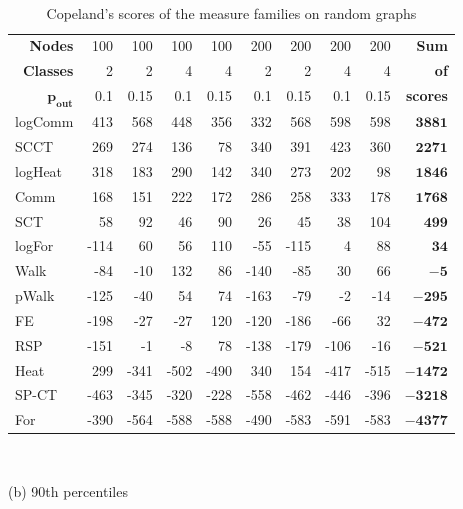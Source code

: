 \documentclass{article}
\begin{document}
\begin{table}[H]
{\begin{minipage}{.49\textwidth}
	\end{minipage}\ \ \ \ \
	\begin{minipage}{.49\textwidth}
		\centering
		\begin{tabular}{lrrrrrrrrr}
			\toprule
			\multicolumn{1}{r}{\textbf{Nodes}}         & 100&    100& 100&  100& 200&  200& 200&  200&{\textbf{Sum}}\\
			\multicolumn{1}{r}{\textbf{Classes}}	   &   2&      2&   4&    4&   2&    2&   4&    4&{\textbf{  of}}\\ %
			\multicolumn{1}{r}{$\bm{p_{\mathbf{out}}}$}& 0.1&	0.15& 0.1& 0.15& 0.1& 0.15& 0.1& 0.15&{\textbf{scores}}\\
			\midrule
            logComm &	413 &	568 &	448 &	356 &	332 &	568 &	598 &	598 &	$\bm{3881}$\\
            SCCT &	269 &	274 &	136 &	78 &	340 &	391 &	423 &	360 &	$\bm{2271}$\\
            logHeat &	318 &	183 &	290 &	142 &	340 &	273 &	202 &	98 &	$\bm{1846}$\\
            Comm &	168 &	151 &	222 &	172 &	286 &	258 &	333 &	178 &	$\bm{1768}$\\
            SCT &	58 &	92 &	46 &	90 &	26 &	45 &	38 &	104 &	$\bm{499}$\\
            logFor &	-114 &	60 &	56 &	110 &	-55 &	-115 &	4 &	88 &	$\bm{34}$\\
            Walk &	-84 &	-10 &	132 &	86 &	-140 &	-85 &	30 &	66 &	$\bm{-5}$\\
            pWalk &	-125 &	-40 &	54 &	74 &	-163 &	-79 &	-2 &	-14 &	$\bm{-295}$\\
            FE &	-198 &	-27 &	-27 &	120 &	-120 &	-186 &	-66 &	32 &	$\bm{-472}$\\
            RSP &	-151 &	-1 &	-8 &	78 &	-138 &	-179 &	-106 &	-16 &	$\bm{-521}$\\
            Heat &	299 &	-341 &	-502 &	-490 &	340 &	154 &	-417 &	-515 &	$\bm{-1472}$\\
            SP-CT &	-463 &	-345 &	-320 &	-228 &	-558 &	-462 &	-446 &	-396 &	$\bm{-3218}$\\
            For &	-390 &	-564 &	-588 &	-588 &	-490 &	-583 &	-591 &	-583 &	$\bm{-4377}$\\
			\bottomrule
		\end{tabular}
		\\[8pt]\centerline{(b) 90th percentiles}
	\end{minipage}
	\caption{\label{t_CopComp}Copeland's scores of the measure families on random graphs}
}\end{table}
\end{document}
